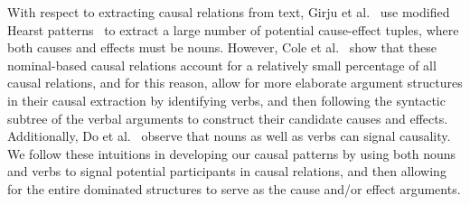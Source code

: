 




With respect to extracting causal relations from text, Girju et al.~\citeyear{girju2002text} use modified Hearst patterns~\cite{hearst1992automatic} to extract a large number of potential cause-effect tuples, where both causes and effects must be nouns.
However, Cole et al.~\citeyear{cole2005lightweight} show that these nominal-based causal relations account for a relatively small percentage of all causal relations, 
and for this reason, \cite{yang2014multi} allow for more elaborate argument structures in their causal extraction by identifying verbs, and then following the syntactic subtree of the verbal arguments to construct their candidate causes and effects. %
Additionally, Do et al.~\citeyear{do2011minimally} observe that nouns as well as verbs can signal causality.  
We follow these intuitions in developing our causal patterns by using both nouns and verbs to signal potential participants in causal relations, and then allowing for the entire dominated structures to serve as the cause and/or effect arguments.

